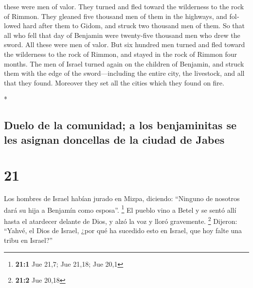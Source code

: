 \begin{paracol}{2}
\begin{otherlanguage}{english}
these were men of valor.  They turned and fled toward the
wilderness to the rock of Rimmon. They gleaned five thousand men of them
in the highways, and followed hard after them to Gidom, and struck two
thousand men of them.  So that all who fell that day of
Benjamin were twenty-five thousand men who drew the sword. All these
were men of valor.  But six hundred men turned and fled
toward the wilderness to the rock of Rimmon, and stayed in the rock of
Rimmon four months.  The men of Israel turned again on
the children of Benjamin, and struck them with the edge of the
sword---including the entire city, the livestock, and all that they
found. Moreover they set all the cities which they found on fire.

\end{otherlanguage}

\switchcolumn[0]*

\hypertarget{duelo-de-la-comunidad-a-los-benjaminitas-se-les-asignan-doncellas-de-la-ciudad-de-jabes}{%
\subsection{Duelo de la comunidad; a los benjaminitas se les asignan
doncellas de la ciudad de
Jabes}\label{duelo-de-la-comunidad-a-los-benjaminitas-se-les-asignan-doncellas-de-la-ciudad-de-jabes}}

\hypertarget{section-40}{%
\section{21}\label{section-40}}

 Los hombres de Israel habían jurado en Mizpa, diciendo:
``Ninguno de nosotros dará su hija a Benjamín como esposa''. \footnote{\textbf{21:1}
  Jue 21,7; Jue 21,18; Jue 20,1}  El pueblo vino a Betel y
se sentó allí hasta el atardecer delante de Dios, y alzó la voz y lloró
gravemente. \footnote{\textbf{21:2} Jue 20,18}  Dijeron:
``Yahvé, el Dios de Israel, ¿por qué ha sucedido esto en Israel, que hoy
falte una tribu en Israel?''


\end{paracol}
